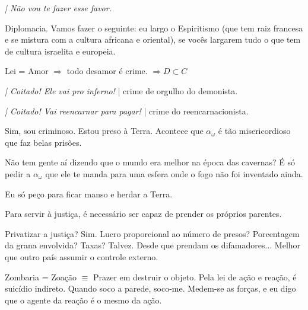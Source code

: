 \documentclass[12pt,a4paper]{article}
\begin{document}
			\emph{| N\~ao vou te fazer esse favor.}

			\begin{flushright}
			\end{flushright}

			Diplomacia. Vamos fazer o seguinte: eu largo o Espiritismo (que tem raiz francesa e se mistura com a cultura africana e oriental), se voc\^es largarem tudo o que tem de cultura israelita e europeia.

			\begin{flushright}
			\end{flushright}

			Lei\cite{x} = Amor\cite{x} $ \Rightarrow $ todo desamor \'e crime. $ \Rightarrow D \subset C $

			\begin{flushright}
			\end{flushright}

			\emph{| Coitado! Ele vai pro inferno!} | crime\cite{x} de orgulho do demonista.

			\emph{| Coitado! Vai reencarnar para pagar!} | crime\cite{x} do reencarnacionista.

			Sim, sou criminoso. Estou preso \`a Terra\cite{x}. Acontece que $ \alpha_\omega $ \'e t\~ao misericordioso que faz belas pris\~oes.

			N\~ao tem gente a\'i dizendo que o mundo era melhor na \'epoca das cavernas? \'E s\'o pedir a $ \alpha_\omega $ que ele te manda para uma esfera onde o fogo n\~ao foi inventado ainda.

			Eu s\'o pe\c{c}o para ficar manso e herdar a Terra.

			\begin{flushright}
			\end{flushright}

			Para servir \`a justi\c{c}a, \'e necess\'ario ser capaz de prender os pr\'oprios parentes.

			\begin{flushright}
			\end{flushright}

			Privatizar a justi\c{c}a? Sim. Lucro proporcional ao n\'umero de presos? Porcentagem da grana envolvida? Taxas? Talvez. Desde que prendam os difamadores... Melhor que outro pa\'is assumir o controle externo.

			\begin{flushright}
			\end{flushright}

			Zombaria = Zoa\c{c}\~ao $\equiv$ Prazer em destruir o objeto. Pela lei de a\c{c}\~ao e rea\c{c}\~ao, \'e suic\'idio indireto. Quando soco a parede, soco-me. Medem-se as for\c{c}as, e eu digo que o agente da rea\c{c}\~ao \'e o mesmo da a\c{c}\~ao.
\end{document}
